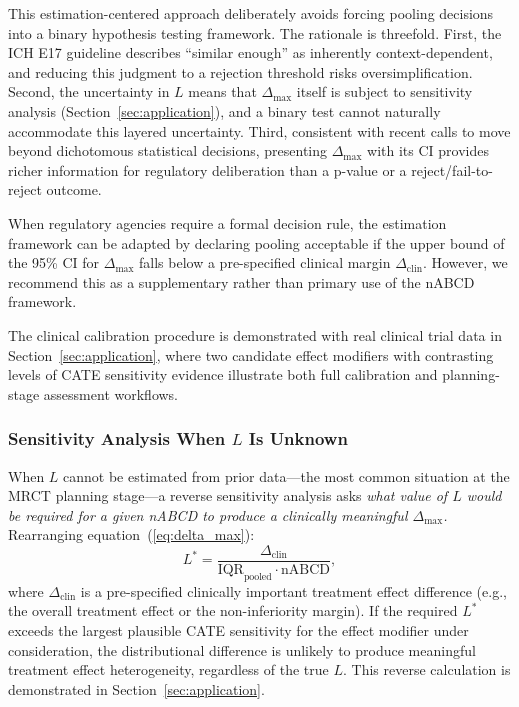 \documentclass[AMA,Times1COL]{WileyNJDv5}
\begin{document}
This estimation-centered approach deliberately avoids forcing pooling decisions into a binary hypothesis testing framework. The rationale is threefold. First, the ICH E17 guideline describes ``similar enough'' as inherently context-dependent, and reducing this judgment to a rejection threshold risks oversimplification. Second, the uncertainty in $L$ means that $\Delta_{\max}$ itself is subject to sensitivity analysis (Section~\ref{sec:application}), and a binary test cannot naturally accommodate this layered uncertainty. Third, consistent with recent calls to move beyond dichotomous statistical decisions,\cite{wasserstein2016} presenting $\Delta_{\max}$ with its CI provides richer information for regulatory deliberation than a p-value or a reject/fail-to-reject outcome.

When regulatory agencies require a formal decision rule, the estimation framework can be adapted by declaring pooling acceptable if the upper bound of the 95\% CI for $\Delta_{\max}$ falls below a pre-specified clinical margin $\Delta_{\text{clin}}$. However, we recommend this as a supplementary rather than primary use of the nABCD framework.

The clinical calibration procedure is demonstrated with real clinical trial data in Section~\ref{sec:application}, where two candidate effect modifiers with contrasting levels of CATE sensitivity evidence illustrate both full calibration and planning-stage assessment workflows.

\subsubsection{Sensitivity Analysis When $L$ Is Unknown}\label{sec:sensitivity}

When $L$ cannot be estimated from prior data---the most common situation at the MRCT planning stage---a reverse sensitivity analysis asks \emph{what value of $L$ would be required for a given nABCD to produce a clinically meaningful $\Delta_{\max}$.} Rearranging equation~(\ref{eq:delta_max}):
\begin{equation}
L^* = \frac{\Delta_{\text{clin}}}{\text{IQR}_{\text{pooled}} \cdot \text{nABCD}},
\label{eq:lstar}
\end{equation}
where $\Delta_{\text{clin}}$ is a pre-specified clinically important treatment effect difference (e.g., the overall treatment effect or the non-inferiority margin). If the required $L^*$ exceeds the largest plausible CATE sensitivity for the effect modifier under consideration, the distributional difference is unlikely to produce meaningful treatment effect heterogeneity, regardless of the true $L$. This reverse calculation is demonstrated in Section~\ref{sec:application}.
\end{document}
